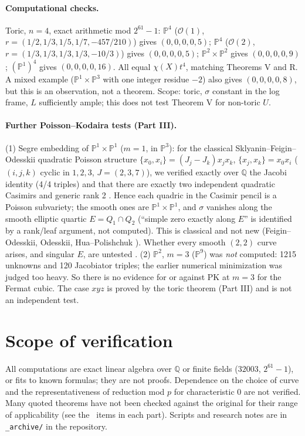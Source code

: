 \paragraph{Computational checks\tV.}Toric, $n=4$, exact arithmetic mod $2^{61}-1$: $\mathbb P^4$ ($\mathcal O(1)$, $r=(1/2,1/3,1/5,1/7,-457/210)$) gives $(0,0,0,0,5)$; $\mathbb P^4$ ($\mathcal O(2)$, $r=(1/3,1/3,1/3,1/3,-10/3)$) gives $(0,0,0,0,5)$; $\mathbb P^2\times\mathbb P^2$ gives $(0,0,0,0,9)$; $(\mathbb P^1)^4$ gives $(0,0,0,0,16)$. All equal $\chi(X)t^4$, matching Theorems V and R. A mixed example ($\mathbb P^1\times\mathbb P^3$ with one integer residue $-2$) also gives $(0,0,0,0,8)$, but this is an observation, not a theorem. Scope: toric, $\sigma$ constant in the log frame, $L$ sufficiently ample; this does not test Theorem V for non-toric $U$.

\paragraph{Further Poisson--Kodaira tests (Part III).}(1) Segre embedding of $\mathbb P^1\times\mathbb P^1$ ($m=1$, in $\mathbb P^3$): for the classical Sklyanin--Feigin--Odesskii quadratic Poisson structure $\{x_0,x_i\}=(J_j-J_k)x_jx_k$, $\{x_j,x_k\}=x_0x_i$ ($(i,j,k)$ cyclic in $1,2,3$, $J=(2,3,7)$), we verified exactly over $\mathbb Q$ the Jacobi identity (4/4 triples) and that there are exactly two independent quadratic Casimirs and generic rank 2 \tV. Hence each quadric in the Casimir pencil is a Poisson subvariety; the smooth ones are $\mathbb P^1\times\mathbb P^1$, and $\sigma$ vanishes along the smooth elliptic quartic $E=Q_1\cap Q_2$ (``simple zero exactly along $E$'' is identified by a rank/leaf argument, not computed). This is classical and not new (Feigin--Odesskii, Odesskii, Hua--Polishchuk \tQ). Whether every smooth $(2,2)$ curve arises, and singular $E$, are untested \tK. (2) $\mathbb P^2$, $m=3$ ($\mathbb P^9$) was \emph{not} computed: 1215 unknowns and 120 Jacobiator triples; the earlier numerical minimization was judged too heavy. So there is no evidence for or against PK at $m=3$ for the Fermat cubic. The case $xyz$ is proved by the toric theorem (Part III) and is not an independent test.

\section{Scope of verification}
All computations are exact linear algebra over $\mathbb Q$ or finite fields ($32003$, $2^{61}-1$), or fits to known formulas; they are not proofs. Dependence on the choice of curve and the representativeness of reduction mod $p$ for characteristic $0$ are not verified. Many quoted theorems have not been checked against the original for their range of applicability (see the \tQ\ items in each part). Scripts and research notes are in \texttt{\_archive/} in the repository.
